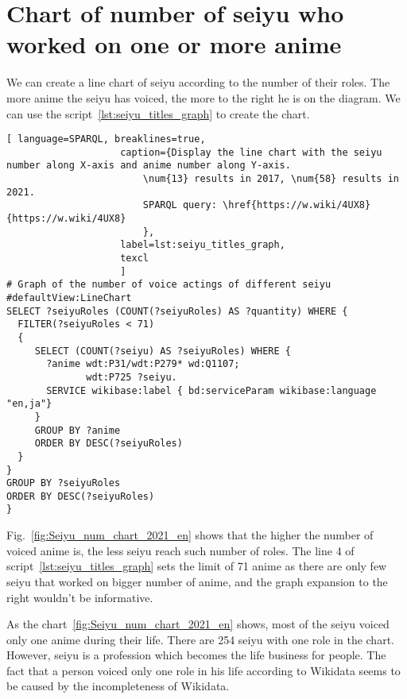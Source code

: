 \section{Chart of number of seiyu who worked on one or more anime}

We can create a line chart of seiyu according to the number of their roles. The more anime the seiyu has voiced, the more to the right he is on the diagram. We can use the script~\ref{lst:seiyu_titles_graph} to create the chart.

\begin{lstlisting}[ language=SPARQL, breaklines=true,
                    caption={Display the line chart with the seiyu number along X-axis and anime number along Y-axis.
                        \num{13} results in 2017, \num{58} results in 2021.
                        SPARQL query: \href{https://w.wiki/4UX8}{https://w.wiki/4UX8}
                        },
                    label=lst:seiyu_titles_graph,
                    texcl 
                    ]
# Graph of the number of voice actings of different seiyu
#defaultView:LineChart
SELECT ?seiyuRoles (COUNT(?seiyuRoles) AS ?quantity) WHERE {
  FILTER(?seiyuRoles < 71)
  {
     SELECT (COUNT(?seiyu) AS ?seiyuRoles) WHERE {
       ?anime wdt:P31/wdt:P279* wd:Q1107;
              wdt:P725 ?seiyu.
       SERVICE wikibase:label { bd:serviceParam wikibase:language "en,ja"}
     }
     GROUP BY ?anime
     ORDER BY DESC(?seiyuRoles)
  }
}
GROUP BY ?seiyuRoles
ORDER BY DESC(?seiyuRoles)
}
\end{lstlisting}%

Fig.~\ref{fig:Seiyu_num_chart_2021_en} shows that the higher the number of voiced anime is, the less seiyu reach such number of roles. The line \num{4} of script~\ref{lst:seiyu_titles_graph} sets the limit of \num{71} anime as there are only few seiyu that worked on bigger number of anime, and the graph expansion to the right wouldn't be informative.

As the chart~\ref{fig:Seiyu_num_chart_2021_en} shows, most of the seiyu voiced only one anime during their life. There are \num{254} seiyu with one role in the chart. However, seiyu is a profession which becomes the life business for people. The fact that a person voiced only one role in his life according to Wikidata seems to be caused by the incompleteness of Wikidata.

\begin{figure*}[h]

    \setlength{\fboxsep}{0pt}%
    \setlength{\fboxrule}{1pt}%
	\caption[Chart of number of roles voiced by different seiyu, 2021.]{Chart of number of roles voiced by different seiyu, 2021. The chart is constructed using the output of script~\ref{lst:seiyu_titles_graph}.}%
    \label{fig:Seiyu_num_chart_2021_en}%
\end{figure*} 

